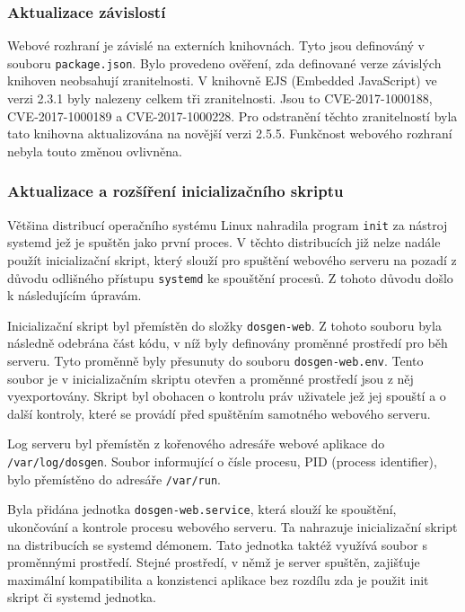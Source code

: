 \subsubsection{Aktualizace závislostí}
Webové rozhraní je závislé na externích knihovnách. Tyto jsou definováný v souboru \texttt{package.json}. Bylo provedeno ověření, zda definované verze závislých knihoven neobsahují zranitelnosti. V knihovně EJS (Embedded JavaScript) ve verzi 2.3.1 byly nalezeny celkem tři zranitelnosti. Jsou to CVE-2017-1000188, CVE-2017-1000189 a CVE-2017-1000228. Pro odstranění těchto zranitelností byla tato knihovna aktualizována na novější verzi 2.5.5. Funkčnost webového rozhraní nebyla touto změnou ovlivněna.

\subsubsection{Aktualizace a rozšíření inicializačního skriptu}
Většina distribucí operačního systému Linux nahradila program \texttt{init} za nástroj systemd jež je spuštěn jako první proces. V těchto distribucích již nelze nadále použít inicializační skript, který slouží pro spuštění webového serveru na pozadí z důvodu odlišného přístupu \texttt{systemd} ke spouštění procesů. Z tohoto důvodu došlo k následujícím úpravám.

Inicializační skript byl přemístěn do složky \texttt{dosgen-web}. Z tohoto souboru byla následně odebrána část kódu, v níž byly definovány proměnné prostředí pro běh serveru. Tyto proměnně byly přesunuty do souboru \texttt{dosgen-web.env}. Tento soubor je v inicializačním skriptu otevřen a proměnné prostředí jsou z něj vyexportovány. Skript byl obohacen o kontrolu práv uživatele jež jej spouští a o další kontroly, které se provádí před spuštěním samotného webového serveru.

Log serveru byl přemístěn z kořenového adresáře webové aplikace do \newline \texttt{/var/log/dosgen}. Soubor informující o čísle procesu, PID (process identifier), bylo přemístěno do adresáře \texttt{/var/run}.

Byla přidána jednotka \texttt{dosgen-web.service}, která slouží ke spouštění, ukončování a kontrole procesu webového serveru. Ta nahrazuje inicializační skript na distribucích se systemd démonem. Tato jednotka taktéž využívá soubor s proměnnými prostředí. Stejné prostředí, v němž je server spuštěn, zajišťuje maximální kompatibilita a konzistenci aplikace bez rozdílu zda je použit init skript či systemd jednotka.

